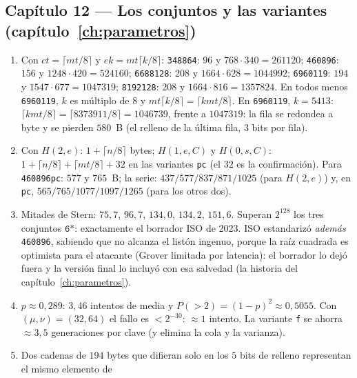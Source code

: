 \documentclass[11pt,a4paper,oneside]{report}
\begin{document}
\subsection*{Capítulo 12 --- Los conjuntos y las variantes
(capítulo~\ref{ch:parametros})}

\begin{enumerate}[leftmargin=1.9em,itemsep=4pt]
  \item Con $ct=\lceil mt/8\rceil$ y $ek=mt\lceil k/8\rceil$:
        \texttt{348864}: $96$ y $768\cdot340=\num{261120}$;
        \texttt{460896}: $156$ y $1248\cdot420=\num{524160}$;
        \texttt{6688128}: $208$ y $1664\cdot628=\num{1044992}$;
        \texttt{6960119}: $194$ y $1547\cdot677=\num{1047319}$;
        \texttt{8192128}: $208$ y $1664\cdot816=\num{1357824}$.
        En todos menos \texttt{6960119}, $k$ es múltiplo de $8$ y
        $mt\lceil k/8\rceil=\lceil kmt/8\rceil$. En
        \texttt{6960119}, $k=5413$: $\lceil kmt/8\rceil
        =\lceil\num{8373911}/8\rceil=\num{1046739}$, frente a
        $\num{1047319}$: la fila se redondea a byte y se pierden
        $580$~B (el relleno de la última fila, $3$ bits por fila).
  \item Con $H(2,e)$: $1+\lceil n/8\rceil$ bytes;
        $H(1,e,C)$ y $H(0,s,C)$: $1+\lceil n/8\rceil+\lceil mt/8\rceil
        +32$ en las variantes \texttt{pc} (el $32$ es la
        confirmación). Para \texttt{460896pc}: $577$ y $765$~B; la
        serie: $437/577/837/871/1025$ (para $H(2,e)$) y, en
        \texttt{pc}, $565/765/1077/1097/1265$ (para los otros dos).
  \item Mitades de Stern: $75{,}7$, $96{,}7$, $134{,}0$,
        $134{,}2$, $151{,}6$. Superan $2^{128}$ los tres conjuntos
        $\texttt{6*}$: exactamente el borrador ISO de 2023. ISO
        estandarizó \emph{además} \texttt{460896}, sabiendo que no
        alcanza el listón ingenuo, porque la raíz cuadrada es
        optimista para el atacante (Grover limitada por latencia):
        el borrador lo dejó fuera y la versión final lo incluyó con
        esa salvedad (la historia del capítulo~\ref{ch:parametros}).
  \item $p\approx0{,}289$: $3{,}46$ intentos de media y
        $P(>2)=(1-p)^2\approx0{,}5055$. Con $(\mu,\nu)=(32,64)$ el
        fallo es $<2^{-30}$: $\approx1$ intento. La variante
        \texttt{f} se ahorra $\approx3{,}5$ generaciones por clave
        (y elimina la cola y la varianza).
  \item Dos cadenas de $194$ bytes que difieran solo en los $5$
        bits de relleno representan el mismo elemento de

\end{enumerate}
\end{document}
